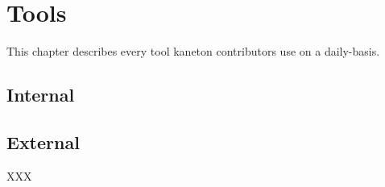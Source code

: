 %
%
%
%
%
%

%
%

\chapter{Tools}

This chapter describes every tool kaneton contributors use on a daily-basis.

\newpage

%
%

%
%

\section{Internal}





%
%

\section{External}

XXX
